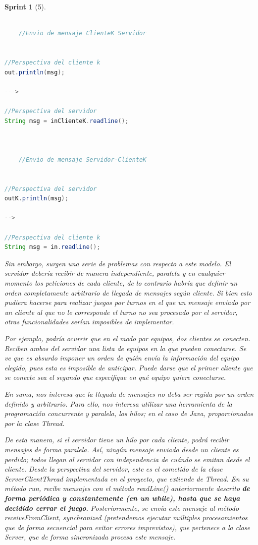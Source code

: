 \documentclass{article}
\theoremstyle{break}
\newtheorem*{sprint}{Sprint}
\begin{document}
\begin{sprint}[5]
\begin{lstlisting}[frame=single, language=Java]

	//Envio de mensaje ClienteK Servidor


//Perspectiva del cliente k
out.println(msg);

--->

//Perspectiva del servidor
String msg = inClienteK.readline();



	//Envio de mensaje Servidor-ClienteK


//Perspectiva del servidor
outK.println(msg);

-->

//Perspectiva del cliente k
String msg = in.readline();
\end{lstlisting}

Sin embargo, surgen una serie de problemas con respecto a este modelo. El servidor debería recibir de manera independiente, paralela y en cualquier momento los peticiones de cada cliente, de lo contrario habría que definir un orden completamente arbitrario de llegada de mensajes según cliente. Si bien esto pudiera hacerse para realizar juegos por turnos en el que un mensaje enviado por un cliente al que no le corresponde el turno no sea procesado por el servidor, otras funcionalidades serían imposibles de implementar.

Por ejemplo, podría ocurrir que en el modo por equipos, dos clientes se conecten. Reciben ambos del servidor una lista de equipos en la que pueden conectarse. Se ve que es absurdo imponer un orden de quién envía la información del equipo elegido, pues esta es imposible de anticipar. Puede darse que el primer cliente que se conecte sea el segundo que especifique en qué equipo quiere conectarse.

En suma, nos interesa que la llegada de mensajes no deba ser regida por un orden definido y arbitrario. Para ello, nos interesa utilizar una herramienta de la programación concurrente y paralela, los hilos; en el caso de Java, proporcionados por la clase Thread.

De esta manera, si el servidor tiene un hilo por cada cliente, podrá recibir mensajes de forma paralela. Así, ningún mensaje enviado desde un cliente es perdido; todos llegan al servidor con independencia de cuándo se emitan desde el cliente. Desde la perspectiva del servidor, este es el cometido de la clase ServerClientThread implementada en el proyecto, que extiende de Thread. En su método run, recibe mensajes con el método readLine() anteriormente descrito \textbf{de forma periódica y constantemente (en un while), hasta que se haya decidido cerrar el juego}. Posteriormente, se envía este mensaje al método receiveFromClient, synchronized (pretendemos ejecutar múltiples procesamientos que de forma secuencial para evitar errores imprevistos), que pertenece a la clase Server, que de forma sincronizada procesa este mensaje.


\end{sprint}
\end{document}
